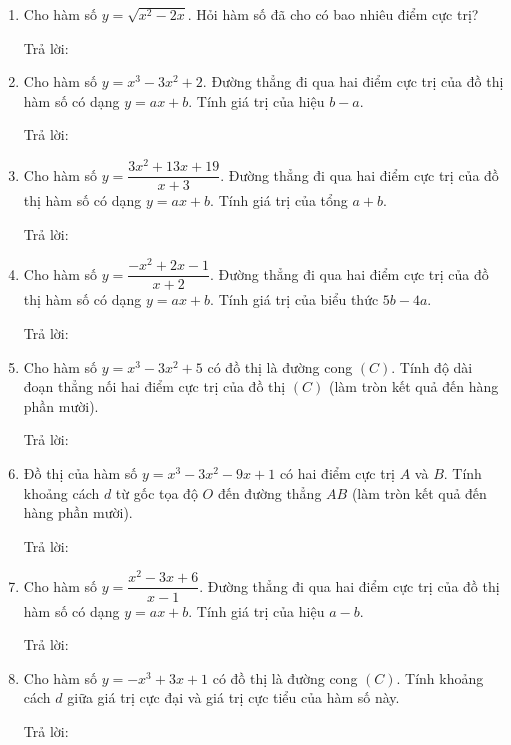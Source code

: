 \documentclass[12pt]{article}
\newcommand{\otraloi}{\underline{\hspace{5cm}}}
\begin{document}
	\begin{enumerate}[label=\textbf{Câu \arabic*.}]
		
		
		\item Cho hàm số $y = \sqrt{x^2 - 2x}$. Hỏi hàm số đã cho có bao nhiêu điểm cực trị?
		\par Trả lời: \otraloi
		
		\item Cho hàm số $y = x^3 - 3x^2 + 2$. Đường thẳng đi qua hai điểm cực trị của đồ thị hàm số có dạng $y = ax + b$. Tính giá trị của hiệu $b - a$.
		\par Trả lời: \otraloi
		
		\item Cho hàm số $y = \dfrac{3x^2 + 13x + 19}{x + 3}$. Đường thẳng đi qua hai điểm cực trị của đồ thị hàm số có dạng $y = ax + b$. Tính giá trị của tổng $a + b$.
		\par Trả lời: \otraloi
		
		\item Cho hàm số $y = \dfrac{-x^2 + 2x - 1}{x + 2}$. Đường thẳng đi qua hai điểm cực trị của đồ thị hàm số có dạng $y = ax + b$. Tính giá trị của biểu thức $5b - 4a$.
		\par Trả lời: \otraloi
		
		\item Cho hàm số $y = x^3 - 3x^2 + 5$ có đồ thị là đường cong $(C)$. Tính độ dài đoạn thẳng nối hai điểm cực trị của đồ thị $(C)$ (làm tròn kết quả đến hàng phần mười).
		\par Trả lời: \otraloi
		
		\item Đồ thị của hàm số $y = x^3 - 3x^2 - 9x + 1$ có hai điểm cực trị $A$ và $B$. Tính khoảng cách $d$ từ gốc tọa độ $O$ đến đường thẳng $AB$ (làm tròn kết quả đến hàng phần mười).
		\par Trả lời: \otraloi
		
		\item Cho hàm số $y = \dfrac{x^2 - 3x + 6}{x - 1}$. Đường thẳng đi qua hai điểm cực trị của đồ thị hàm số có dạng $y = ax + b$. Tính giá trị của hiệu $a - b$.
		\par Trả lời: \otraloi
		
		\item Cho hàm số $y = -x^3 + 3x + 1$ có đồ thị là đường cong $(C)$. Tính khoảng cách $d$ giữa giá trị cực đại và giá trị cực tiểu của hàm số này.
		\par Trả lời: \otraloi
		

\end{enumerate}
\end{document}
